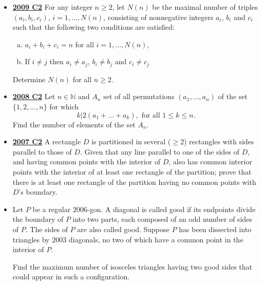 \documentclass[11pt]{scrartcl}
\begin{document}
\begin{itemize}[leftmargin=*]
    Determine the smallest positive integer $M$ such that among any $M$ distinct flags, there exist $N$ flags forming a diverse set.
    \item \href{https://artofproblemsolving.com/community/c6h355784p1932924}{\textbf{2009 C2}} For any integer $n\geqslant  2$, let $N(n)$ be the maximal number of triples $(a_i, b_i, c_i)$, $i=1, \dots, N(n)$, consisting of nonnegative integers $a_i$, $b_i$ and $c_i$ such that the following two conditions are satisfied:
    \begin{enumerate}[(a)]
        \item $a_i+b_i+c_i=n$ for all $i=1, \dots, N(n)$,
        \item If $i\neq j$ then $a_i\neq a_j$, $b_i\neq b_j$ and $c_i\neq c_j$
    \end{enumerate} 
    Determine $N(n)$ for all $n\geqslant  2$.
    
    \item \href{https://artofproblemsolving.com/community/c6h271833p1472110}{\textbf{2008 C2}} Let $n \in \mathbb N$ and $A_n$ set of all permutations $(a_1, \dots, a_n)$ of the set $\{1, 2, \dots , n\}$ for which
\[k|2(a_1 + \dots+ a_k), \text{ for all } 1 \leqslant k \leqslant n.\]
Find the number of elements of the set $A_n$.
    \item \href{https://artofproblemsolving.com/community/c6h195050p1071295}{\textbf{2007 C2}} A rectangle $ D$ is partitioned in several ($ \geqslant 2$) rectangles with sides parallel to those of $ D$. Given that any line parallel to one of the sides of $ D$, and having common points with the interior of $ D$, also has common interior points with the interior of at least one rectangle of the partition; prove that there is at least one rectangle of the partition having no common points with $ D$'s boundary.
    \newpage
    \item {} Let $P$ be a regular $2006$-gon. A diagonal is called good if its endpoints divide the boundary of $P$ into two parts, each composed of an odd number of sides of $P$. The sides of $P$ are also called good. Suppose $P$ has been dissected into triangles by $2003$ diagonals, no two of which have a common point in the interior of $P$.
    
    Find the maximum number of isosceles triangles having two good sides that could appear in such a configuration.
\end{itemize}
\newpage
\end{document}
